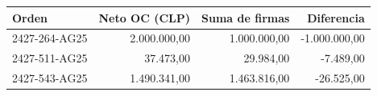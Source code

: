 \begin{tabular}{@{}lrrr@{}}
\toprule
Orden & Neto OC (CLP) & Suma de firmas & Diferencia\\
\midrule
2427-264-AG25 & 2.000.000,00 & 1.000.000,00 & -1.000.000,00 \\
2427-511-AG25 & 37.473,00 & 29.984,00 & -7.489,00 \\
2427-543-AG25 & 1.490.341,00 & 1.463.816,00 & -26.525,00 \\
\bottomrule
\end{tabular}
